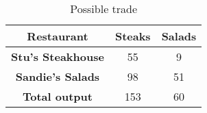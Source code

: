\begin{table}
    \begin{tabular}{|c|c|c|}
      \hline
      \textbf{Restaurant} & \textbf{Steaks} & \textbf{Salads} \\
      \hline
      \textbf{Stu's Steakhouse} & 55 & 9 \\
      \hline
      \textbf{Sandie's Salads} & 98 & 51 \\
      \hline
      \textbf{Total output} & 153 & 60 \\
      \hline
    \end{tabular}
    \caption{Possible trade}
  \end{table}